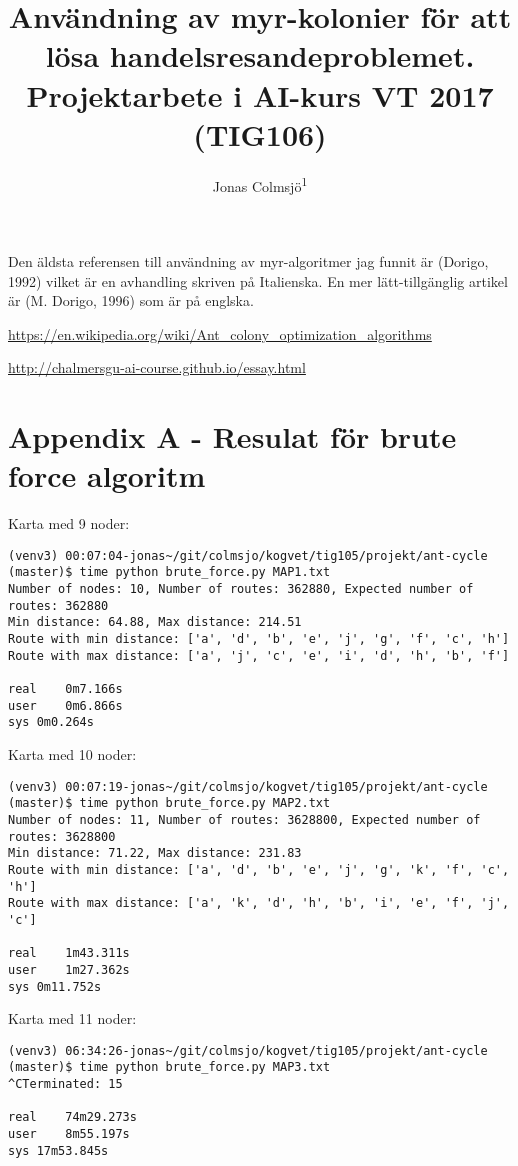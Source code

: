\documentclass[english,man]{apa6}
\title{Användning av myr-kolonier för att lösa handelsresandeproblemet.
Projektarbete i AI-kurs VT 2017 (TIG106)}
\author{Jonas Colmsjö\textsuperscript{1}}
\affiliation{
    \vspace{0.5cm}
          \textsuperscript{1} Göteborgs Universitet  }
\begin{document}
\maketitle

\setcounter{secnumdepth}{0}



Den äldsta referensen till användning av myr-algoritmer jag funnit är
(Dorigo, 1992) vilket är en avhandling skriven på Italienska. En mer
lätt-tillgänglig artikel är (M. Dorigo, 1996) som är på englska.

\url{https://en.wikipedia.org/wiki/Ant_colony_optimization_algorithms}

\url{http://chalmersgu-ai-course.github.io/essay.html}

\section{Appendix A - Resulat för brute force
algoritm}\label{appendix-a---resulat-for-brute-force-algoritm}

Karta med 9 noder:

\begin{verbatim}
(venv3) 00:07:04-jonas~/git/colmsjo/kogvet/tig105/projekt/ant-cycle (master)$ time python brute_force.py MAP1.txt
Number of nodes: 10, Number of routes: 362880, Expected number of routes: 362880
Min distance: 64.88, Max distance: 214.51
Route with min distance: ['a', 'd', 'b', 'e', 'j', 'g', 'f', 'c', 'h']
Route with max distance: ['a', 'j', 'c', 'e', 'i', 'd', 'h', 'b', 'f']

real    0m7.166s
user    0m6.866s
sys 0m0.264s
\end{verbatim}

Karta med 10 noder:

\begin{verbatim}
(venv3) 00:07:19-jonas~/git/colmsjo/kogvet/tig105/projekt/ant-cycle (master)$ time python brute_force.py MAP2.txt
Number of nodes: 11, Number of routes: 3628800, Expected number of routes: 3628800
Min distance: 71.22, Max distance: 231.83
Route with min distance: ['a', 'd', 'b', 'e', 'j', 'g', 'k', 'f', 'c', 'h']
Route with max distance: ['a', 'k', 'd', 'h', 'b', 'i', 'e', 'f', 'j', 'c']

real    1m43.311s
user    1m27.362s
sys 0m11.752s
\end{verbatim}

Karta med 11 noder:

\begin{verbatim}
(venv3) 06:34:26-jonas~/git/colmsjo/kogvet/tig105/projekt/ant-cycle (master)$ time python brute_force.py MAP3.txt
^CTerminated: 15

real    74m29.273s
user    8m55.197s
sys 17m53.845s
\end{verbatim}
\end{document}
